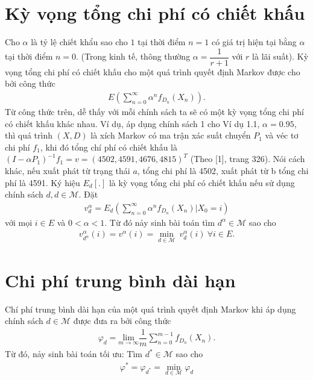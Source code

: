 \documentclass[12pt,a4paper]{report}
\begin{document}
    \section{Kỳ vọng tổng chi phí có chiết khấu}
    Cho $\alpha$ là tỷ lệ chiết khẩu sao cho $1$ tại thời điểm $n=1$ có giá trị hiện tại bằng $\alpha$ tại thời điểm $n=0$. (Trong kinh tế, thông thường $\alpha=\dfrac{1}{r+1}$ với $r$ là lãi suất). Kỳ vọng tổng chi phí có chiết khấu cho một quá trình quyết định Markov được cho bởi công thức 
    \begin{align*}
    E(\sum_{n=0}^{\infty}\alpha^n f_{D_n}(X_n)).
    \end{align*} 
   Từ công thức trên, dễ thấy với mỗi chính sách ta sẽ có một kỳ vọng tổng chi phí có chiết khấu khác nhau.
   Ví dụ, áp dụng chính sách 1 cho Ví dụ 1.1, $\alpha=0.95$, thì quá trình $(X,D)$ là xích Markov có ma trận xác suất chuyển $P_1$ và véc tơ chi phí $f_1$, khi đó tổng chí phí có chiết khấu là $(I-\alpha P_1)^{-1}f_1=v=(4502, 4591, 4676, 4815)^T$ (Theo [1], trang 326). Nói cách khác, nếu xuất phát từ trạng thái $a$, tổng chi phí là 4502, xuất phát từ b tổng chi phí là 4591.  Ký hiệu $E_d[.]$ là kỳ vọng tổng chi phí có chiết khấu nếu sử dụng chính sách $d, d \in \mathcal{M}$. Đặt
   \begin{align*}
   v^{\alpha}_d= E_d(\sum_{n=0}^{\infty}\alpha^n f_{D_n}(X_n)|X_0=i)
   \end{align*} 
   với mọi $i \in E$ và $0<\alpha<1$. Từ đó nảy sinh bài toán tìm $d^{\alpha} \in \mathcal{M}$ sao cho
   \begin{align}
    v^{\alpha}_{d^\alpha}(i)=v^{\alpha}(i)=\underset{d \in \mathcal{M}}{\min} \ v^{\alpha}_d(i) \ \forall i\in E.  
    \end{align}
    
    \section{Chi phí trung bình dài hạn}
    Chí phí trung bình dài hạn của một quá trình quyết định Markov khi áp dụng chính sách $d \in \mathcal{M}$ được đưa ra bởi công thức
    \begin{align*}
    \varphi_d=\underset{m \rightarrow \infty}{\mathrm{lim}}\dfrac{1}{m}\sum_{n=0}^{m-1}f_{D_n}(X_n). 
    \end{align*}
    Từ đó, nảy sinh bài toán tối ưu: Tìm $d^* \in \mathcal{M}$ sao cho 
    \begin{align}
    \varphi^*=\varphi_{d^*}=\underset{d \in \mathcal{M}}{\min} \varphi_d
    \end{align}
\end{document}
